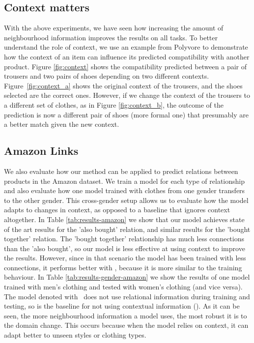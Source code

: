 \documentclass[10pt,twocolumn,letterpaper]{article}
\begin{document}
\subsection{Context matters}
With the above experiments, we have seen how increasing the amount of neighbourhood information improves the results on all tasks. To better understand the role of context, 
we use an example from Polyvore to demonstrate how the context of an item can influence its predicted compatibility with another product. 
Figure \ref{fig:context} 
shows the compatibility predicted between a pair of trousers and two pairs of shoes depending on two different contexts. Figure~\ref{fig:context_a} shows the original context of the trousers, and the shoes selected are the correct ones. However, if we change the context of the trousers to a different set of clothes, as in Figure \ref{fig:context_b}, the outcome of the prediction is now a different pair of shoes (more formal one) that presumably are a better match given the new context.

\subsection{Amazon Links}
We also evaluate how our method can be applied to predict relations between products in the Amazon dataset. We train a model for each type of relationship and also evaluate how one model trained with clothes from one gender transfers to the other gender. This cross-gender setup allows us to evaluate how the model adapts to changes in context, as opposed to a baseline that ignores context altogether. In Table \ref{tab:results-amazon} we show that our model achieves state of the art results for the 'also bought' relation, and similar results for the 'bought together' relation. The 'bought together' relationship has much less connections than the 'also bought', so our model is less effective at using context to improve the results. However, since in that scenario the model has been trained with less connections, it performs better with , because it is more similar to the training behaviour. In Table \ref{tab:results-gender-amazon} we show the results of one model trained with men's clothing and tested with women's clothing (and vice versa). The model denoted with \textdagger ~does not use relational information during training and testing, so is the baseline for not using contextual information (). As it can be seen, the more neighbourhood information a model uses, the most robust it is to the domain change. This occurs because when the model relies on context, it can adapt better to unseen styles or clothing types.
\end{document}
